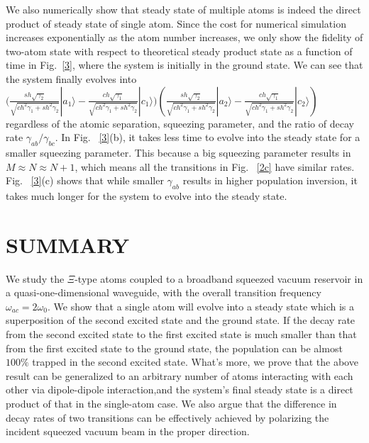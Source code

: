 \documentclass[aps,showpacs,twocolumn,twoside,groupedaddress]{revtex4}
\begin{document}
We also numerically show that steady state of multiple atoms is indeed the direct product of steady state of single atom. Since the cost for numerical simulation increases exponentially as the atom number increases, we only show the fidelity of two-atom state with respect to theoretical steady product state as a function of time in Fig.~\ref{3}, where the system is initially in the ground state. We can see that the system finally evolves into $\ensuremath{(\frac{sh\sqrt{\gamma_{2}}}{\sqrt{ch^{2}\gamma_{1}+sh^{2}\gamma_{2}}}|a_{1}\rangle-\frac{ch\sqrt{\gamma_{1}}}{\sqrt{ch^{2}\gamma_{1}+sh^{2}\gamma_{2}}}|c_{1}\rangle})(\frac{sh\sqrt{\gamma_{2}}}{\sqrt{ch^{2}\gamma_{1}+sh^{2}\gamma_{2}}}|a_{2}\rangle-\frac{ch\sqrt{\gamma_{1}}}{\sqrt{ch^{2}\gamma_{1}+sh^{2}\gamma_{2}}}|c_{2}\rangle)$ regardless of the atomic separation, squeezing parameter, and the ratio of decay rate $\gamma_{ab}/\gamma_{bc}$. In Fig. ~\ref{3}(b), it takes less time to evolve into the steady state for a smaller squeezing parameter. This because a big squeezing parameter results in $M\approx N\approx N+1$, which means all the transitions in Fig. ~\ref{2c} have similar rates. Fig. ~\ref{3}(c) shows that while smaller $\gamma_{ab}$ results in higher population inversion, it takes much longer for the system to evolve into the steady state.


 
\section{SUMMARY}
We study the $\Xi$-type atoms coupled to a broadband squeezed vacuum reservoir in a quasi-one-dimensional waveguide, with the overall transition frequency $\omega_{ac}=2\omega_0$. We show that a single atom will evolve into a steady state which is a superposition of the second excited state and the ground state. If the decay rate from the second excited state to the first excited state is much smaller than that from the first excited state to the ground state, the population can be almost $100\%$ trapped in the second excited state. What's more, we prove that the above result can be generalized to an arbitrary number of atoms interacting with each other via dipole-dipole interaction,and the system's final steady state is a direct product of that in the single-atom case. We also argue that the difference in decay rates of two transitions can be effectively achieved by polarizing the incident squeezed vacuum beam in the proper direction. 
\end{document}
